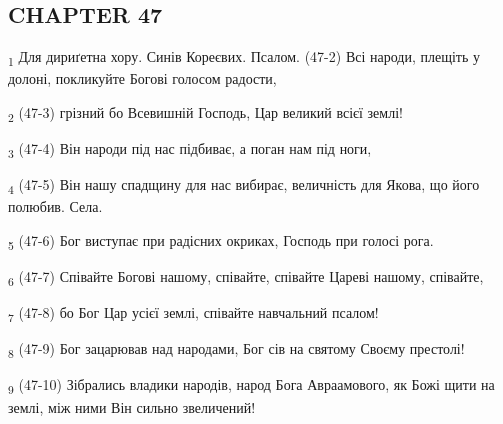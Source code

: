 \subsection{CHAPTER 47}
\begin{tcolorbox}
\textsubscript{1} Для дириґетна хору. Синів Кореєвих. Псалом. (47-2) Всі народи, плещіть у долоні, покликуйте Богові голосом радости,
\end{tcolorbox}
\begin{tcolorbox}
\textsubscript{2} (47-3) грізний бо Всевишній Господь, Цар великий всієї землі!
\end{tcolorbox}
\begin{tcolorbox}
\textsubscript{3} (47-4) Він народи під нас підбиває, а поган нам під ноги,
\end{tcolorbox}
\begin{tcolorbox}
\textsubscript{4} (47-5) Він нашу спадщину для нас вибирає, величність для Якова, що його полюбив. Села.
\end{tcolorbox}
\begin{tcolorbox}
\textsubscript{5} (47-6) Бог виступає при радісних окриках, Господь при голосі рога.
\end{tcolorbox}
\begin{tcolorbox}
\textsubscript{6} (47-7) Співайте Богові нашому, співайте, співайте Цареві нашому, співайте,
\end{tcolorbox}
\begin{tcolorbox}
\textsubscript{7} (47-8) бо Бог Цар усієї землі, співайте навчальний псалом!
\end{tcolorbox}
\begin{tcolorbox}
\textsubscript{8} (47-9) Бог зацарював над народами, Бог сів на святому Своєму престолі!
\end{tcolorbox}
\begin{tcolorbox}
\textsubscript{9} (47-10) Зібрались владики народів, народ Бога Авраамового, як Божі щити на землі, між ними Він сильно звеличений!
\end{tcolorbox}
